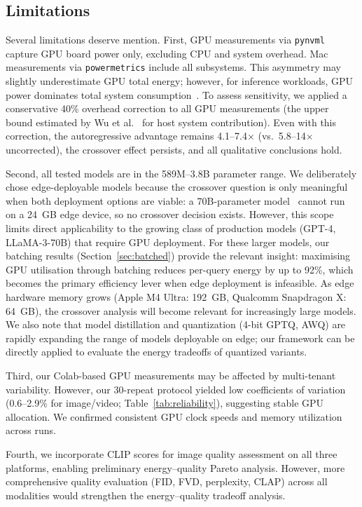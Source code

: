 \documentclass[preprint,12pt]{elsarticle}
\begin{document}
\subsection{Limitations}

Several limitations deserve mention. First, GPU measurements via \texttt{pynvml} capture GPU board power only, excluding CPU and system overhead. Mac measurements via \texttt{powermetrics} include all subsystems. This asymmetry may slightly underestimate GPU total energy; however, for inference workloads, GPU power dominates total system consumption~\cite{patterson2021carbon,wu2022sustainable}. To assess sensitivity, we applied a conservative 40\% overhead correction to all GPU measurements (the upper bound estimated by Wu et al.~\cite{wu2022sustainable} for host system contribution). Even with this correction, the autoregressive advantage remains 4.1--7.4$\times$ (vs.\ 5.8--14$\times$ uncorrected), the crossover effect persists, and all qualitative conclusions hold.

Second, all tested models are in the 589M--3.8B parameter range. We deliberately chose edge-deployable models because the crossover question is only meaningful when both deployment options are viable: a 70B-parameter model~\cite{touvron2023llama} cannot run on a 24~GB edge device, so no crossover decision exists. However, this scope limits direct applicability to the growing class of production models (GPT-4, LLaMA-3-70B) that require GPU deployment. For these larger models, our batching results (Section~\ref{sec:batched}) provide the relevant insight: maximising GPU utilisation through batching reduces per-query energy by up to 92\%, which becomes the primary efficiency lever when edge deployment is infeasible. As edge hardware memory grows (Apple M4 Ultra: 192~GB, Qualcomm Snapdragon X: 64~GB), the crossover analysis will become relevant for increasingly large models. We also note that model distillation and quantization (4-bit GPTQ, AWQ) are rapidly expanding the range of models deployable on edge; our framework can be directly applied to evaluate the energy tradeoffs of quantized variants.

Third, our Colab-based GPU measurements may be affected by multi-tenant variability. However, our 30-repeat protocol yielded low coefficients of variation (0.6--2.9\% for image/video; Table~\ref{tab:reliability}), suggesting stable GPU allocation. We confirmed consistent GPU clock speeds and memory utilization across runs.

Fourth, we incorporate CLIP scores for image quality assessment on all three platforms, enabling preliminary energy--quality Pareto analysis. However, more comprehensive quality evaluation (FID, FVD, perplexity, CLAP) across all modalities would strengthen the energy--quality tradeoff analysis.
\end{document}
